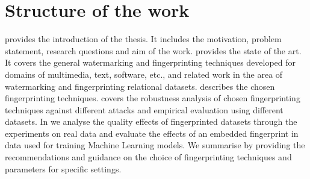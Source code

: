 \section{Structure of the work}
 provides the introduction of the thesis. It includes the motivation, problem statement, research questions and aim of the work. 
 provides the state of the art. It covers the general watermarking and fingerprinting techniques developed for domains of multimedia, text, software, etc., and related work in the area of watermarking and fingerprinting relational datasets.  describes the chosen fingerprinting techniques.  covers the robustness analysis of chosen fingerprinting techniques against different attacks and empirical evaluation using different datasets. In  we analyse the quality effects of fingerprinted datasets through the experiments on real data and evaluate the effects of an embedded fingerprint in data used for training Machine Learning models. We summarise by providing the recommendations and guidance on the choice of fingerprinting techniques and parameters for specific settings.

 